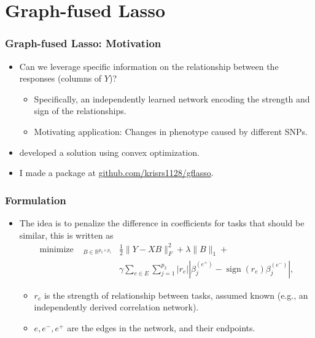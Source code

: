 \documentclass[10pt]{beamer}\usepackage[]{graphicx}\usepackage[]{color}
\def\reals{\mathbb{R}} %
\providecommand{\sign}{\mathop\mathrm{sign}}
\def\absarg#1{\left|#1\right|}
\providecommand{\minimize}{\mathop\mathrm{minimize\quad}} %
\begin{document}
\section{Graph-fused Lasso}

\begin{frame}
  \frametitle{Graph-fused Lasso: Motivation}
\begin{itemize}
\item Can we leverage specific information on the relationship between the
  responses (columns of $Y$)?
  \begin{itemize}
  \item Specifically, an independently learned network encoding the strength
    and sign of the relationships.
  \item Motivating application: Changes in phenotype caused by different SNPs.
  \end{itemize}
\item \cite{chen2012smoothing} developed a solution using convex optimization.
\item I made a package at \url{github.com/krisrs1128/gflasso}.
\end{itemize}
\end{frame}

\begin{frame}
  \frametitle{Formulation}
  \begin{itemize}
  \item The idea is to penalize the difference in coefficients for tasks that should be similar, this is written as
    \begin{align}
      \minimize_{B \in \reals^{p_{2} \times p_{1}}} &\frac{1}{2}\|Y -
  XB\|_{F}^{2} + \lambda \|B\|_{1} + \\ &\gamma \sum_{e \in E} \sum_{j =
    1}^{p_{2}} \absarg{r_{e}}\absarg{\beta_{j}^{(e^{+})} -
    \sign\left(r_{e}\right) \beta^{(e^{-})}_{j}}, \label{eq:gflasso_obj}
    \end{align}
    \begin{itemize}
      \item $r_{e}$ is the strength of relationship between tasks, assumed
        known (e.g., an independently derived correlation network).
      \item $e, e^{-}, e^{+}$ are the edges in the network, and their endpoints.
    \end{itemize}
  \end{itemize}
\end{frame}
\end{document}
